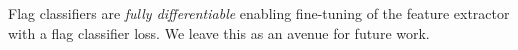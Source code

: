     Flag classifiers are \emph{fully differentiable} enabling fine-tuning of the feature extractor with a flag classifier loss. We leave this as an avenue for future work.
\begin{comment}
Take a feature extractor that decomposes into $k \geq 2$ functions. Specifically,
    \begin{equation}
        f_{\Theta} = f_{\Theta}^{(1)} \circ \cdots \circ f_{\Theta}^{(k)}:\mathcal{X} \rightarrow \R^n,
    \end{equation} 
    where each $f_{\Theta}^{(i)}$ maps to $\R^n$.
    We generalize~\cref{ex:feature_hierarchy} to construct a $k$-part hierarchical data matrix. For simplicity, we will consider the case where $k =2$ even though the following procedure generalizes for $k$-part hierarchies. After constructing a data matrix with a corresponding column hierarchy, we use~\algname~to represent the support of one class, $c$, in the feature space as $[\![\Q^{(c)}]\!]\in \flag(n_1,n_2; n)$ (see~\cref{fig:fewshot_flags}). Now, each subspace $[\Q^{(c)}_1]$ and $[\Q^{(c)}_2]$ represents the features extracted by $f_{\Theta}$ and $f_{\Theta}^{(2)}$, respectively.

    Given a flag-prototype $[\![\Q^{(c)}]\!] \in \flag(n_1,n_2;n)$ and a query $\left\{f_{\Theta}(\bm{x}), f^{(2)}_{\Theta}(\bm{x})\right\} \subset\R^n$, we measure distance between the query and the prototype flag as
    \begin{align}\label{eq: fewshot_dist}
        \begin{aligned}
        &\left \| f_{\Theta}(\bm{x}) - \Q^{(c)}_1 {\Q^{(c)}_1}^\top f_{\Theta}(\bm{x}) \right \|_2^2 \\
        &+ \left \| f_{\Theta}^{(2)}(\bm{x}) - \Q^{(c)}_2 {\Q^{(c)}_2}^\top f_{\Theta}^{(2)}(\bm{x}) \right \|_2^2
        \end{aligned}
    \end{align}
    This is proportional to the squared chordal distance on $\flag(1,2;n)$ when the matrix $[f_{\Theta}(\bm{x})| f^{(2)}_{\Theta}(\bm{x})]$ is in Stiefel coordinates (\eg, has orthonormal columns). This happens exactly when the range of $f_{\Theta}$ is orthogonal to the range of $f^{(2)}_{\Theta}$. In this case, normalizing $f_{\Theta}(\bm{x})$ and $f^{(2)}_{\Theta}(\bm{x})$ creates a Stiefel coordinate representative.

    Flag classifiers are \emph{fully differentiable}. So fine-tuning of the feature extractor can be done with any differentiable loss function (e.g., cross-entropy). We leave this as an avenue for future work.
\end{comment}



